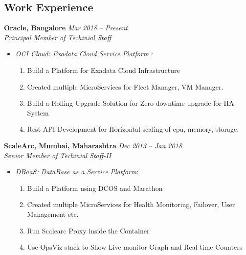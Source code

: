 \documentclass[margin,line]{resume}
\begin{document}
\begin{resume}
    \section{\mysidestyle Work Experience}
    
     \textbf{Oracle, Bangalore }\hfill \textsl{Mar 2018 -- Present}\vspace{0mm}\\\vspace{0mm}%
    \textsl{Principal Member of Techinial Staff}  
    \begin{itemize}
    \item \textsl{OCI Cloud: Exadata Cloud Service Platform }: 
    \begin{enumerate}
    \item Build a Platform for Exadata Cloud Infrastructure 
    \item Created multiple MicroServices for Fleet Manager,  VM Manager.
    \item Build a Rolling Upgrade Solution for Zero downtime upgrade for HA System
    \item Rest API Development for Horizontal scaling of cpu, memory, storage.
    \end{enumerate}
    \end{itemize}

    \textbf{ScaleArc, Mumbai, Maharashtra }\hfill \textsl{Dec 2013 -- Jan 2018}\vspace{0mm}\\\vspace{0mm}%
    \textsl{Senior Member of Techinial Staff-II}      \begin{itemize}
    \item \textsl{DBaaS: DataBase as a Service Platform}: 
    \begin{enumerate}
    \item Build a Platform using DCOS and Marathon
    \item Created multiple MicroServices for Health Monitoring, Failover, User Management etc.
    \item Run Scalearc Proxy inside the Container
    \item Use OpsViz stack to Show Live monitor Graph and Real time Counters
    \end{enumerate}
    

\end{itemize}
\end{resume}
\end{document}
